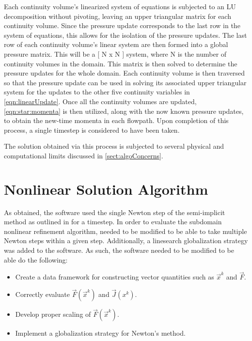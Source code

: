 Each continuity volume's linearized system of equations is subjected to an LU decomposition without pivoting, leaving an upper triangular matrix for each continuity volume.
Since the pressure update corresponds to the last row in the system of equations, this allows for the isolation of the pressure updates.
The last row of each continuity volume's linear system are then formed into a global pressure matrix.
This will be a [ N x N ] system, where N is the number of continuity volumes in the domain.
This matrix is then solved to determine the pressure updates for the whole domain.
Each continuity volume is then traversed so that the pressure update can be used in solving its associated upper triangular system for the updates to the other five continuity variables in \eqref{eqn:linearUpdate}.
Once all the continuity volumes are updated, \eqref{eqn:star:momenta} is then utilized, along with the now known pressure updates, to obtain the new-time momenta in each flowpath.
Upon completion of this process, a single timestep is considered to have been taken.


The solution obtained via this process is subjected to several physical and computational limits discussed in \eqref{sect:algoConcerns}.

\section{Nonlinear Solution Algorithm}
\label{sect:nlnCobraAlg}
As obtained, the \cobra{} software used the single Newton step of the semi-implicit method as outlined in  for a timestep.
In order to evaluate the subdomain nonlinear refinement algorithm, \cobra{} needed to be modified to be able to take multiple Newton steps within a given step.
Additionally, a linesearch globalization strategy was added to the software.
As such, the \cobra{} software needed to be modified to be able do the following:

\begin{itemize}
\item{Create a data framework for constructing vector quantities such as $\vec{x}^{k}$ and $\vec{F}$.}
\item{Correctly evaluate $\vec{F}(\vec{x}^{k})$ and $\vec{J}(x^{k})$.}
\item{Develop proper scaling of $\vec{F}(\vec{x}^{k})$.}
\item{Implement a globalization strategy for Newton's method.}
\end{itemize}


